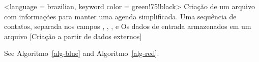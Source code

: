 \documentclass[
  letterpaper,
]{scrbook}
\begin{document}
\begin{algorithm}[H]
\caption{\label{alg-green}}
\begingroup%

\begin{algorithmic}<language = brazilian, keyword color = green!75!black>
    \Description Criação de um arquivo com informações para manter uma agenda simplificada.
    \Input Uma sequência de contatos, separada nos campos , , ,  e 
    \Output Os dados de entrada armazenados em um arquivo
    [Criação a partir de dados externos]
          \Statex
      \EndWhile
    \EndProcedure
\end{algorithmic}

\endgroup
\end{algorithm}

See Algoritmo~\ref{alg-blue} and Algoritmo~\ref{alg-red}.


\backmatter
\end{document}
